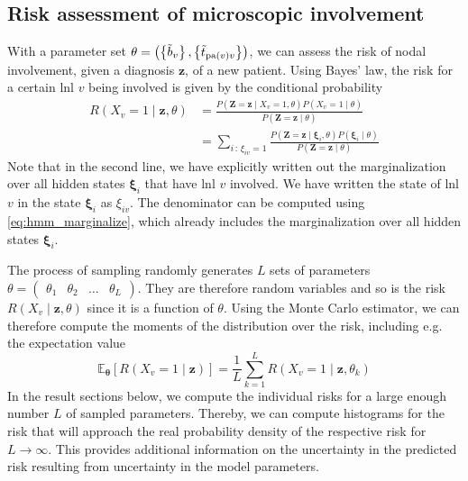 \documentclass[../ms.tex]{subfiles}
\begin{document}
\subsection{Risk assessment of microscopic involvement}
\label{subsec:hmm_risk_assessment}

With a parameter set $\theta = \left( \left\{ \Tilde{b}_v \right\}, \left\{ \Tilde{t}_{\operatorname{pa}(v)v} \right\} \right)$, we can assess the risk of nodal involvement, given a diagnosis $\mathbf{z}$, of a new patient. Using Bayes’ law, the risk for a certain \gls{lnl} $v$ being involved is given by the conditional probability
%
\begin{equation} \label{eq:hmm_risk}
    \begin{aligned}
        R \left( X_v=1 \mid \mathbf{z}, \theta \right) 
        &= \frac{P \left( \mathbf{Z}=\mathbf{z} \mid X_v=1, \theta \right) P \left( X_v=1 \mid \theta \right)}{P \left( \mathbf{Z}=\mathbf{z} \mid \theta \right)} \\
        &= \sum_{i\,:\,\xi_{iv}=1}{\frac{P \left( \mathbf{Z}=\mathbf{z} \mid \boldsymbol{\xi}_i , \theta \right) P \left( \boldsymbol{\xi}_i \mid \theta \right)}{P \left( \mathbf{Z}=\mathbf{z} \mid \theta \right)}}
    \end{aligned}
\end{equation}
%
Note that in the second line, we have explicitly written out the marginalization over all hidden states $\boldsymbol{\xi}_i$ that have \gls{lnl} $v$ involved. We have written the state of \gls{lnl} $v$ in the state $\boldsymbol{\xi}_i$ as $\xi_{iv}$. The denominator can be computed using \cref{eq:hmm_marginalize}, which already includes the marginalization over all hidden states $\boldsymbol{\xi}_i$.

The process of sampling randomly generates $L$ sets of parameters $\theta = \begin{pmatrix} \theta_1 & \theta_2 & \ldots & \theta_L \end{pmatrix}$. They are therefore random variables and so is the risk $R \left( X_v \mid \mathbf{z}, \theta \right)$ since it is a function of $\theta$. Using the Monte Carlo estimator, we can therefore compute the moments of the distribution over the risk, including e.g. the expectation value
%
\begin{equation}
    \mathbb{E}_{\boldsymbol{\theta}} \left[ R \left( X_v = 1 \mid \mathbf{z} \right) \right] = \frac{1}{L} \sum_{k=1}^{L}{R \left( X_v = 1 \mid \mathbf{z}, \theta_k \right)}
\end{equation}
%
In the result sections below, we compute the individual risks for a large enough number $L$ of sampled parameters. Thereby, we can compute histograms for the risk that will approach the real probability density of the respective risk for $L \rightarrow \infty$. This provides additional information on the uncertainty in the predicted risk resulting from uncertainty in the model parameters.
\end{document}

